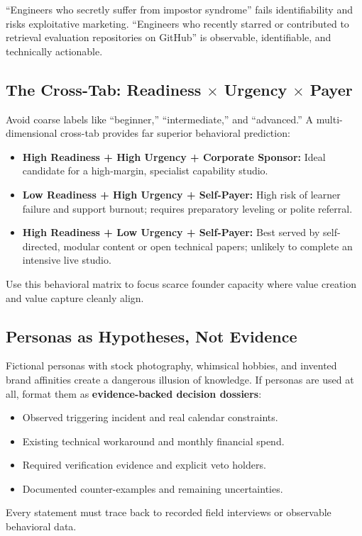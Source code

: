 ``Engineers who secretly suffer from impostor syndrome'' fails identifiability and risks exploitative marketing. ``Engineers who recently starred or contributed to retrieval evaluation repositories on GitHub'' is observable, identifiable, and technically actionable.

\subsection{The Cross-Tab: Readiness $\times$ Urgency $\times$ Payer}

Avoid coarse labels like ``beginner,'' ``intermediate,'' and ``advanced.'' A multi-dimensional cross-tab provides far superior behavioral prediction:
\begin{itemize}[leftmargin=1.2em,itemsep=0.2ex]
  \item \textbf{High Readiness + High Urgency + Corporate Sponsor:} Ideal candidate for a high-margin, specialist capability studio.
  \item \textbf{Low Readiness + High Urgency + Self-Payer:} High risk of learner failure and support burnout; requires preparatory leveling or polite referral.
  \item \textbf{High Readiness + Low Urgency + Self-Payer:} Best served by self-directed, modular content or open technical papers; unlikely to complete an intensive live studio.
\end{itemize}
Use this behavioral matrix to focus scarce founder capacity where value creation and value capture cleanly align.

\subsection{Personas as Hypotheses, Not Evidence}

Fictional personas with stock photography, whimsical hobbies, and invented brand affinities create a dangerous illusion of knowledge. If personas are used at all, format them as \textbf{evidence-backed decision dossiers}:
\begin{itemize}[leftmargin=1.2em,itemsep=0.2ex]
  \item Observed triggering incident and real calendar constraints.
  \item Existing technical workaround and monthly financial spend.
  \item Required verification evidence and explicit veto holders.
  \item Documented counter-examples and remaining uncertainties.
\end{itemize}
Every statement must trace back to recorded field interviews or observable behavioral data.

